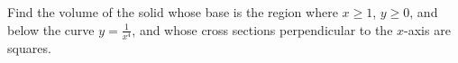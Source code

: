\documentclass[]{ximera}
\begin{document}
\begin{problem}
Find the volume of the solid whose base is the region where $x \geq 1$, $y \geq 0$, and below the curve $y=\frac{1}{x^4}$, and whose cross sections perpendicular to the $x$-axis are squares.
	\begin{freeResponse}
	
	\end{freeResponse}

\end{problem}

\begin{instructorNotes}

\end{instructorNotes}

















	
	
	
	
	
	
	
	
	

	










								
				
				
	
\end{document}
